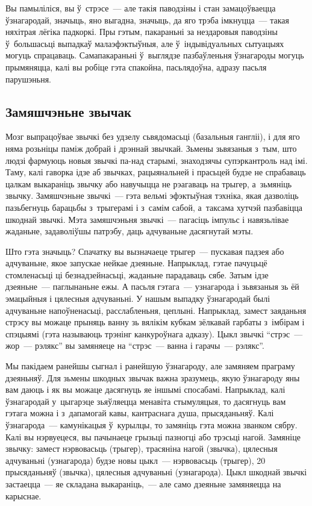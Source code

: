 
Вы памыліліся, вы ў~стрэсе~--- але такія паводзіны і стан замацоўваецца ўзнагародай, значыць, яно выгадна, значыць, да яго трэба імкнуцца~--- такая няхітрая лёгіка падкоркі. Пры гэтым, пакараньні за нездаровыя паводзіны ў~большасьці выпадкаў малаэфэктыўныя, але ў~індывідуальных сытуацыях могуць спрацаваць. Самапакараньні ў~выглядзе пазбаўленьня ўзнагароды могуць прымяняцца, калі вы робіце гэта спакойна, пасьлядоўна, адразу пасьля парушэньня.

\subsection*{Замяшчэньне звычак}

Мозг выпрацоўвае звычкі без удзелу сьвядомасьці (базальныя гангліі), і для яго няма розьніцы паміж добрай і дрэннай звычкай. Зьмены зьвязаныя з~тым, што людзі фармуюць новыя звычкі па-над старымі, знаходзячы супэркантроль над імі. Таму, калі гаворка ідзе аб звычках, рацыянальней і прасьцей будзе не спрабаваць цалкам выкараніць звычку або навучыцца не рэагаваць на трыгер, а~зьмяніць звычку. Замяшчэньне звычкі~--- гэта вельмі эфэктыўная тэхніка, якая дазволіць пазьбегнуць барацьбы з~трыгерамі і з~самім сабой, а~таксама хутчэй пазбавіцца шкоднай звычкі. Мэта замяшчэньня звычкі~--- пагасіць імпульс і навязьлівае жаданьне, задаволіўшы патрэбу, даць адчуваньне дасягнутай мэты.

Што гэта значыць? Спачатку вы вызначаеце трыгер~--- пускавая падзея або адчуваньне, якое запускае нейкае дзеяньне. Напрыклад, гэтае пачуцьцё стомленасьці ці безнадзейнасьці, жаданьне парадаваць сябе. Затым ідзе дзеяньне~--- паглынаньне ежы. А пасьля гэтага~--- узнагарода і зьвязаныя зь ёй эмацыйныя і цялесныя адчуваньні. У нашым выпадку ўзнагародай былі адчуваньне напоўненасьці, расслабленьня, цеплыні. Напрыклад, замест заяданьня стрэсу вы можаце прыняць ванну зь вялікім кубкам зёлкавай гарбаты з~імбірам і спэцыямі (гэта называюць трэнінг канкуроўнага адказу). Цыкл звычкі ``стрэс~--- жор~--- рэлякс'' вы замяняеце на ``стрэс~--- ванна і гарачы~--- рэлякс''.

Мы пакідаем ранейшы сыгнал і ранейшую ўзнагароду, але замяняем праграму дзеяньняў. Для зьмены шкодных звычак важна зразумець, якую ўзнагароду яны вам даюць і як вы можаце дасягнуць яе іншымі спосабамі. Напрыклад, калі ўзнагародай у~цыгарэце зьяўляецца менавіта стымуляцыя, то дасягнуць вам гэтага можна і з~дапамогай кавы, кантраснага душа, прысяданьняў. Калі ўзнагарода~--- камунікацыя ў~курылцы, то замяніць гэта можна званком сябру. Калі вы нэрвуецеся, вы пачынаеце грызьці пазногці або трэсьці нагой. Замяніце звычку: замест нэрвовасьць (трыгер), трасяніна нагой (звычка), цялесныя адчуваньні (узнагарода) будзе новы цыкл~--- нэрвовасьць (трыгер), 20 прысяданьняў (звычка), цялесныя адчуваньні (узнагарода). Цыкл шкоднай звычкі застаецца~--- яе складана выкараніць,~--- але само дзеяньне замяняецца на карыснае.

